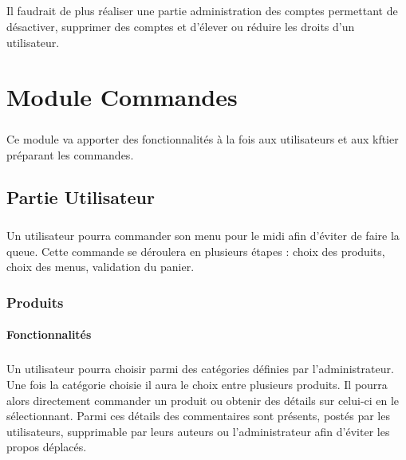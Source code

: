 \documentclass[twoside,UTF8]{EPURapport}
\begin{document}
        \paragraph{}Il faudrait de plus réaliser une partie administration des comptes permettant de désactiver, supprimer des comptes et d'élever ou réduire les droits d'un utilisateur.

\chapter{Module Commandes}

    \paragraph{}Ce module va apporter des fonctionnalités à la fois aux utilisateurs et aux kftier préparant les commandes.

    \section{Partie Utilisateur}

        \paragraph{}Un utilisateur pourra commander son menu pour le midi afin d'éviter de faire la queue. Cette commande se déroulera en plusieurs étapes : choix des produits, choix des menus, validation du panier.

        \subsection{Produits}

            \subsubsection{Fonctionnalités}

                \paragraph{}Un utilisateur pourra choisir parmi des catégories définies par l'administrateur. Une fois la catégorie choisie il aura le choix entre plusieurs produits. Il pourra alors directement commander un produit ou obtenir des détails sur celui-ci en le sélectionnant. Parmi ces détails des commentaires sont présents, postés par les utilisateurs, supprimable par leurs auteurs ou l'administrateur afin d'éviter les propos déplacés.
\end{document}

